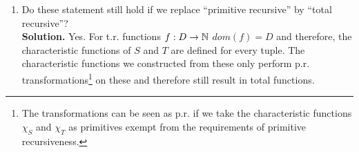\begin{enumerate}
	\item Do these statement still hold if we replace ``primitive recursive'' by ``total recursive''?\\
	
	\textbf{Solution.} Yes. For t.r. functions $f : D \rightarrow \mathbb{N}$ $dom(f) = D$ and therefore, the characteristic functions of $S$ and $T$ are defined for every tuple. The characteristic functions we constructed from these only perform p.r. transformations\footnote{The transformations can be seen as p.r. if we take the characteristic functions $\chi_S$ and $\chi_T$ as primitives exempt from the requirements of primitive recursiveness.} on these and therefore still result in total functions.

\end{enumerate}


